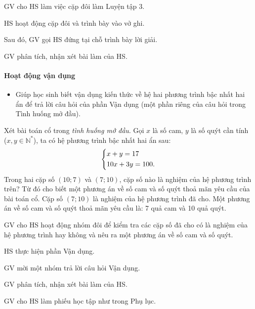 \begin{tcth}[luyentap=3]
    \buocmot
    \item GV cho HS làm việc cặp đôi làm Luyện tập 3.
    \buochai
    \item HS hoạt động cặp đôi và trình	bày vào vở ghi. 
    \buocba
    \item Sau đó, GV gọi HS đứng tại chỗ trình bày lời giải. 
    \buocbon
    \item GV phân tích, nhận xét bài làm của HS.
\end{tcth}

\paragraph{Hoạt động vận dụng}

\muctieu

\begin{itemize}
    \item Giúp học sinh biết vận dụng kiến thức về hệ hai phương trình bậc nhất hai ẩn để
    trả lời câu hỏi của phần Vận dụng (một phần riêng của câu hỏi trong Tình huống mở đầu). 
\end{itemize}

\noidungsanpham

\begin{vandung}
    Xét bài toán cổ trong \textit{tình huống mở đầu}. Gọi $x$ là số cam, $y$ là số quýt cần tính ($x, y \in \mathbb{N}^*$), ta có hệ phương trình bậc nhất hai ẩn sau:
    $$\left\{\begin{aligned}&x+y=17\\&10x+3y=100.\end{aligned}\right.$$
    Trong hai cặp số $(10; 7)$ và $(7; 10)$, cặp số nào là nghiệm của hệ phương trình trên? Từ đó cho biết một phương án về số cam và số quýt thoả mãn yêu cầu của bài toán cổ.
    \doicot
    \huongdan Cặp số $(7; 10)$ là nghiệm của hệ phương trình đã cho. Một phương án về số cam và số quýt thoả mãn yêu cầu là: 7 quả cam và 10 quả quýt. 
\end{vandung}

\tochucthuchien

\begin{tcth}
    \buocmot
    \item GV cho HS hoạt động nhóm đôi để kiểm tra các cặp số đã cho có là nghiệm của hệ phương trình hay không và nêu ra một phương án về số cam và số quýt.
    \buochai
    \item HS thực hiện phần Vận dụng.
    \buocba
    \item GV mời một nhóm trả lời câu hỏi Vận dụng.
    \buocbon
    \item GV phân tích, nhận xét bài làm của HS.
    \item GV cho HS làm phiếu học tập như trong Phụ lục.
\end{tcth}

